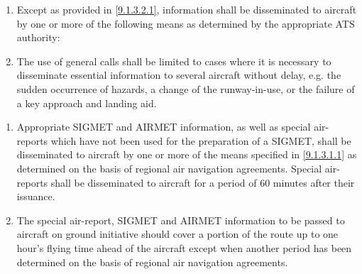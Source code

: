 \begin{enumeratesc}
    \begin{enumerate}
        \item \label{9.1.3.1.1} Except as provided in \ref{9.1.3.2.1}, information shall be disseminated to aircraft by one or more of the following means as determined by the appropriate ATS authority:

        \item The use of general calls shall be limited to cases where it is necessary to disseminate essential information to several aircraft without delay, e.g. the sudden occurrence of hazards, a change of the runway-in-use, or the failure of a key approach and landing aid.
    \end{enumerate}

    \begin{enumerate}
        \item \label{9.1.3.2.1} Appropriate SIGMET and AIRMET information, as well as special air-reports which have not been used for the preparation of a SIGMET, shall be disseminated to aircraft by one or more of the means specified in \ref{9.1.3.1.1} as determined on the basis of regional air navigation agreements. Special air-reports shall be disseminated to aircraft for a period of 60 minutes after their issuance.
        \item The special air-report, SIGMET and AIRMET information to be passed to aircraft on ground initiative should cover a portion of the route up to one hour's flying time ahead of the aircraft except when another period has been determined on the basis of regional air navigation agreements.
    \end{enumerate}


\end{enumeratesc}
